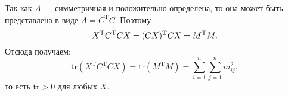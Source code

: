 \documentclass{article}
\begin{document}
Так как $A$ --- симметричная и положительно определена, то она может быть представлена в виде $A=C^{\mathrm{T}}C$. Поэтому
$$
X^{\mathrm{T}}C^{\mathrm{T}}CX=(CX)^{\mathrm{T}}CX=M^{\mathrm{T}}M.\\
$$
Отсюда получаем:
$$
\mathrm{tr}(X^{\mathrm{T}}C^{\mathrm{T}}CX)= \mathrm{tr}(M^{\mathrm{T}}M) = \sum\limits_{i=1}^{n} \sum\limits_{j=1}^{n} m_{ij}^2,
$$
то есть $\mathrm{tr}>0$ для любых $X$.
\end{document}
